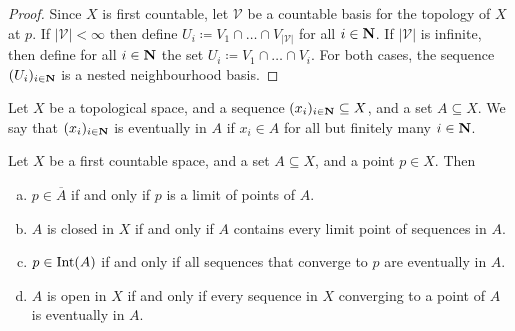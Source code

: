 \begin{proof}
Since \(X\) is first countable, let \(\mathcal V\) be a countable basis for the
topology of \(X\) at \(p\). If \(|\mathcal V| < \infty\) then define \(U_i \coloneq
V_1 \cap \dots \cap V_{|\mathcal V|}\) for all \(i \in \mathbf{N}\). If
\(|\mathcal V|\) is infinite, then define for all \(i \in \mathbf{N}\) the
set \(U_i \coloneq V_1 \cap \dots \cap V_i\). For both cases, the sequence
\((U_i)_{i \in \mathbf{N}}\) is a nested neighbourhood basis.
\end{proof}

\begin{definition}[Eventually in]
Let \(X\) be a topological space, and a sequence \((x_i)_{i \in \mathbf{N}}
\subseteq X\), and a set \(A \subseteq X\). We say that \((x_i)_{i \in
\mathbf{N}}\) is eventually in \(A\) if \(x_i \in A\) for all but finitely
many \(i \in \mathbf{N}\).
\end{definition}

\begin{lemma}\label{lem: sequence lemma}
Let \(X\) be a first countable space, and a set \(A \subseteq X\), and a point
\(p \in X\). Then
\begin{enumerate}[(a)]
  \item \(p \in \overline A\) if and only if \(p\) is a limit of points of
    \(A\).
  \item \(A\) is closed in \(X\) if and only if \(A\) contains every limit
    point of sequences in \(A\).
  \item \(p \in \operatorname{Int}(A)\) if and only if all sequences that converge to
    \(p\) are eventually in \(A\).
  \item \(A\) is open in \(X\) if and only if every sequence in \(X\)
    converging to a point of \(A\) is eventually in \(A\).
\end{enumerate}
\end{lemma}

